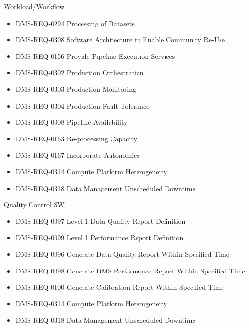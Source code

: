 Workload/Workflow \begin{itemize}
\item DMS-REQ-0294 Processing of Datasets
\item DMS-REQ-0308 Software Architecture to Enable Community Re-Use
\item DMS-REQ-0156 Provide Pipeline Execution Services
\item DMS-REQ-0302 Production Orchestration
\item DMS-REQ-0303 Production Monitoring
\item DMS-REQ-0304 Production Fault Tolerance
\item DMS-REQ-0008 Pipeline Availability
\item DMS-REQ-0163 Re-processing Capacity
\item DMS-REQ-0167 Incorporate Autonomics
\item DMS-REQ-0314 Compute Platform Heterogeneity
\item DMS-REQ-0318 Data Management Unscheduled Downtime
\end{itemize}
Quality Control SW \begin{itemize}
\item DMS-REQ-0097 Level 1 Data Quality Report Definition
\item DMS-REQ-0099 Level 1 Performance Report Definition
\item DMS-REQ-0096 Generate Data Quality Report Within Specified Time
\item DMS-REQ-0098 Generate DMS Performance Report Within Specified Time
\item DMS-REQ-0100 Generate Calibration Report Within Specified Time
\item DMS-REQ-0314 Compute Platform Heterogeneity
\item DMS-REQ-0318 Data Management Unscheduled Downtime
\end{itemize}
